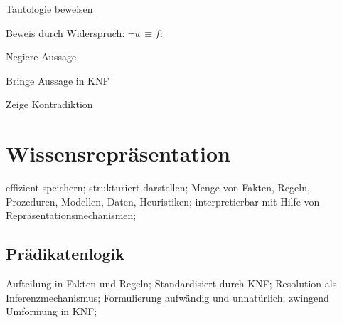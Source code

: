 \documentclass[german,color,6pt]{latex4ei/latex4ei_sheet}
\begin{document}
\begin{sectionbox}
\begin{cookbox}{Tautologie beweisen}
	\item[] Beweis durch Widerspruch: $\neg w \equiv f$:
	\item Negiere Aussage
	\item Bringe Aussage in KNF
	\item Zeige Kontradiktion
\end{cookbox}
\end{sectionbox}

\section{Wissensrepräsentation}
\begin{symbolbox}
	effizient speichern; strukturiert darstellen; Menge von Fakten, Regeln, Prozeduren, Modellen, Daten, Heuristiken; interpretierbar mit Hilfe von Repräsentationsmechanismen;
\end{symbolbox}

\begin{sectionbox}
\subsection{Prädikatenlogik}
Aufteilung in Fakten und Regeln; Standardisiert durch KNF; Resolution als Inferenzmechanismus; Formulierung aufwändig und unnatürlich; zwingend Umformung in KNF;
\end{sectionbox}
\end{document}
